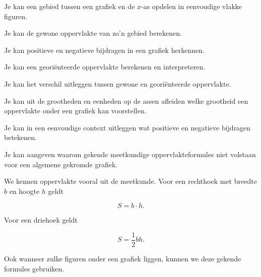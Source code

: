 \documentclass{ximera}
\begin{document}
\begin{leerdoelen}
  \item Je kan een gebied tussen een grafiek en de \(x\)-as opdelen in eenvoudige vlakke figuren.
  \item Je kan de gewone oppervlakte van zo'n gebied berekenen.
  \item Je kan positieve en negatieve bijdragen in een grafiek herkennen.
  \item Je kan een georiënteerde oppervlakte berekenen en interpreteren.
  \item Je kan het verschil uitleggen tussen gewone en georiënteerde oppervlakte.
  \item Je kan uit de grootheden en eenheden op de assen afleiden welke grootheid een oppervlakte onder een grafiek kan voorstellen.
  \item Je kan in een eenvoudige context uitleggen wat positieve en negatieve bijdragen betekenen.
  \item Je kan aangeven waarom gekende meetkundige oppervlakteformules niet volstaan voor een algemene gekromde grafiek.
\end{leerdoelen}




We kennen oppervlakte vooral uit de meetkunde. Voor een rechthoek met
breedte \(b\) en hoogte \(h\) geldt

\[
S=b\cdot h.
\]

Voor een driehoek geldt

\[
S=\frac12 bh.
\]

Ook wanneer zulke figuren onder een grafiek liggen, kunnen we deze
gekende formules gebruiken.
\end{document}
